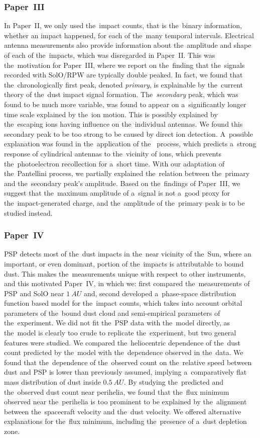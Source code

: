 \subsubsection{Paper~III}

In Paper~II, we only used the~impact counts, that is the~binary information, whether an impact happened, for each of the~many temporal intervals. Electrical antenna measurements also provide information about the~amplitude and shape of each of the~impacts, which was disregarded in Paper~II. This was the~motivation for Paper~III, where we report on the~finding that the~signals recorded with SolO/RPW are typically double peaked. In fact, we found that the~chronologically first peak, denoted \textit{primary}, is explainable by the~current theory of the~dust impact signal formation. The~\textit{secondary} peak, which was found to be much more variable, was found to appear on a~significantly longer time scale explained by the~ion motion. This is possibly explained by the~escaping ions having influence on the~individual antennas. We found this secondary peak to be too strong to be caused by direct ion detection. A~possible explanation was found in the~application of the~\citet{pantellini2012nano} process, which predicts a~strong response of cylindrical antennas to the~vicinity of ions, which prevents the~photoelectron recollection for a~short time. With our adaptation of the~Pantellini process, we partially explained the~relation between the~primary and the~secondary peak's amplitude. Based on the~findings of Paper~III, we suggest that the~maximum amplitude of a~signal is not a~good proxy for the~impact-generated charge, and the~amplitude of the~primary peak is to be studied instead. 

\subsubsection{Paper~IV}

PSP detects most of the~dust impacts in the~near vicinity of the~Sun, where an important, or even dominant, portion of the~impacts is attributable to bound dust. This makes the~measurements unique with respect to other instruments, and this motivated Paper~IV, in which we: first compared the~measurements of PSP and SolO near $\SI{1}{AU}$ and, second developed a~phase-space distribution function based model for the~impact counts, which takes into account orbital parameters of the~bound dust cloud and semi-empirical parameters of the~experiment. We did not fit the~PSP data with the~model directly, as the~model is clearly too crude to replicate the~experiment, but two general features were studied. We compared the~heliocentric dependence of the~dust count predicted by the~model with the~dependence observed in the~data. We found that the~dependence of the~observed count on the~relative speed between dust and PSP is lower than previously assumed, implying a~comparatively flat mass distribution of dust inside $\SI{0.5}{AU}$. By studying the~predicted and the~observed dust count near perihelia, we found that the~flux minimum observed near the~perihelia is too prominent to be explained by the~alignment between the~spacecraft velocity and the~dust velocity. We offered alternative explanations for the~flux minimum, including the~presence of a~dust depletion zone. 